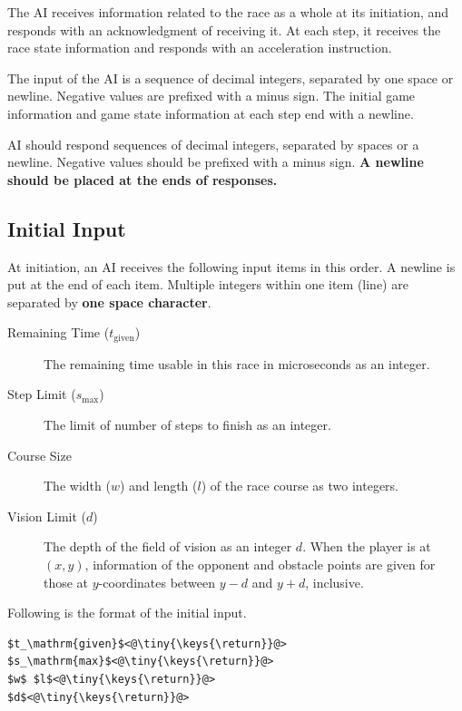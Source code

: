\documentclass[11pt]{article}
\begin{document}
The AI receives information related to the race as a whole at its
initiation, and responds with an acknowledgment of receiving it.  At
each step, it receives the race state information and responds with an
acceleration instruction.

The input of the AI is a sequence of decimal integers, separated by
one space or newline.  Negative values are prefixed with a minus
sign.  The initial game information and game state information at each
step end with a newline.

AI should respond sequences of decimal integers, separated by
spaces or a newline.  Negative values should be prefixed with a minus
sign.  {\bf A newline should be placed at the ends of responses.}

\subsection{Initial Input}
At initiation, an AI receives the following input items in this order.
A newline is put at the end of each item. Multiple integers within one item (line) are separated by {\bf one space character}.
\begin{description}
\item[Remaining Time ($t_\mathrm{given}$)] The remaining time usable in this race in
  microseconds as an integer.
\item[Step Limit ($s_\mathrm{max}$)] The limit of number of steps to finish as an integer.
\item[Course Size] The width ($w$) and length ($l$) of the race course as two integers.
\item[Vision Limit ($d$)] The depth of the field of vision as an integer
  $d$. When the player is at $(x, y)$, information of the opponent and
  obstacle points are given for those at $y$-coordinates between $y-d$
  and $y+d$, inclusive.
\end{description}

\makeatletter
\def\lst@visiblespace{$\color{Gray}{}_{
  \mbox{\kern.06em\vrule \@height.3ex}%
  \vbox{\hrule \@width.3em}%
  \hbox{\vrule \@height.3ex}}$}
\makeatother


\noindent
Following is the format of the initial input.

\begin{lstlisting}
$t_\mathrm{given}$<@\tiny{\keys{\return}}@>
$s_\mathrm{max}$<@\tiny{\keys{\return}}@>
$w$ $l$<@\tiny{\keys{\return}}@>
$d$<@\tiny{\keys{\return}}@>
\end{lstlisting}
\end{document}
